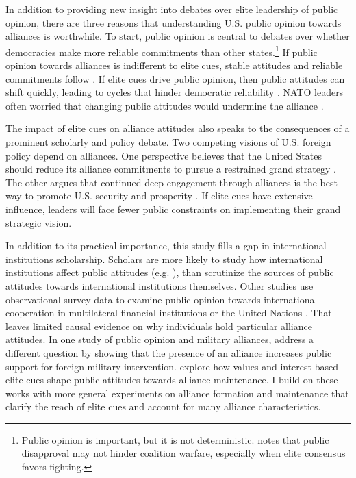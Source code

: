 \documentclass[12pt]{article}
\begin{document}
In addition to providing new insight into debates over elite leadership of public opinion, there are three reasons that understanding U.S. public opinion towards alliances is worthwhile. 
To start, public opinion is central to debates over whether democracies make more reliable commitments than other states.\footnote{Public opinion is important, but it is not deterministic. \citet{Kreps2010} notes that public disapproval may not hinder coalition warfare, especially when elite consensus favors fighting.} 
If public opinion towards alliances is indifferent to elite cues, stable attitudes and reliable commitments follow \citep{Gaubatz1996}.
If elite cues drive public opinion, then public attitudes can shift quickly, leading to cycles that hinder democratic reliability \citep{GartzkeGleditsch2004}.
NATO leaders often worried that changing public attitudes would undermine the alliance \citep{Sayle2019}.  


The impact of elite cues on alliance attitudes also speaks to the consequences of a prominent scholarly and policy debate. 
Two competing visions of U.S. foreign policy depend on alliances. 
One perspective believes that the United States should reduce its alliance commitments to pursue a restrained grand strategy \citep{Preble2009, Posen2014}.
The other argues that continued deep engagement through alliances is the best way to promote U.S. security and prosperity \citep{Brooksetal2013, BrandsFeaver2017}. 
If elite cues have extensive influence, leaders will face fewer public constraints on implementing their grand strategic vision. 


In addition to its practical importance, this study fills a gap in international institutions scholarship. 
Scholars are more likely to study how international institutions affect public attitudes (e.g. \citep{KayaWalker2014, Greenhill2020}), than scrutinize the sources of public attitudes towards international institutions themselves. 
Other studies use observational survey data to examine public opinion towards international cooperation in multilateral financial institutions \citep{Edwards2009} or the United Nations \citep{Torgler2008, DellmuthTallberg2015}. 
That leaves limited causal evidence on why individuals hold particular alliance attitudes.
In one study of public opinion and military alliances, \citet{TomzWeeks2021} address a different question by showing that the presence of an alliance increases public support for foreign military intervention. 
\citet{Chuetal2021} explore how values and interest based elite cues shape public attitudes towards alliance maintenance. 
I build on these works with more general experiments on alliance formation and maintenance that clarify the reach of elite cues and account for many alliance characteristics. 
\end{document}
